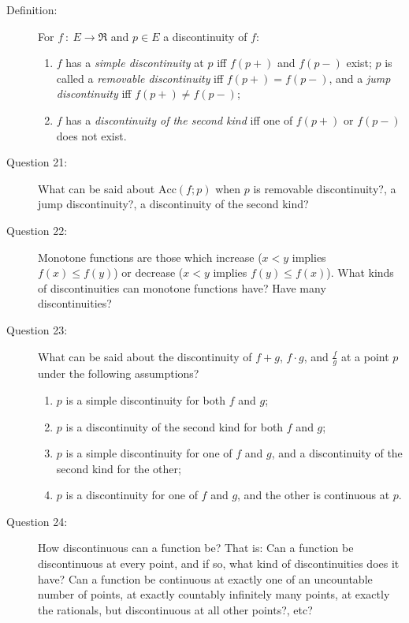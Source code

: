 \documentclass{article}
\begin{document}
\begin{description}
  \item[Definition:] For $f\ :\ E \to \Re$ and $p \in E$ a discontinuity of $f$: 
    \begin{enumerate}[\hspace{1cm}(1)]
      \item $f$ has a \emph{simple discontinuity} at $p$ iff $f(p+)$ and $f(p-)$ exist; $p$ is called a \emph{removable discontinuity} iff $f(p+) = f(p-)$, and a \emph{jump discontinuity} iff $f(p+) \neq f(p-)$;
      \item $f$ has a \emph{discontinuity of the second kind} iff one of $f(p+)$ or $f(p-)$ does not exist.
    \end{enumerate}

  \item[Question 21:] What can be said about $\text{Acc} (f;p)$ when $p$ is removable discontinuity?, a jump discontinuity?, a discontinuity of the second kind?

  \item[Question 22:] Monotone functions are those which increase ($x < y$ implies $f(x) \leq f(y)$) or decrease ($x < y$ implies $f(y) \leq f(x)$). What kinds of discontinuities can monotone functions have? Have many discontinuities?

  \item[Question 23:] What can be said about the discontinuity of $f + g$, $f \cdot g$, and $\frac{f}{g}$ at a point $p$ under the following assumptions?
    \begin{enumerate}[\hspace{1cm}(1)]
      \item $p$ is a simple discontinuity for both $f$ and $g$;
      \item $p$ is a discontinuity of the second kind for both $f$ and $g$;
      \item $p$ is a simple discontinuity for one of $f$ and $g$, and a discontinuity of the second kind for the other;
      \item $p$ is a discontinuity for one of $f$ and $g$, and the other is continuous at $p$.
    \end{enumerate}

  \item[Question 24:] How discontinuous can a function be? That is: Can a function be discontinuous at every point, and if so, what kind of discontinuities does it have? Can a function be continuous at exactly one of an uncountable number of points, at exactly countably infinitely many points, at exactly the rationals, but discontinuous at all other points?, etc?


\end{description}
\end{document}

